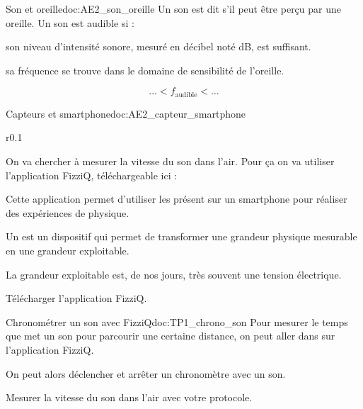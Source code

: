\begin{doc}{Son et oreille}{doc:AE2_son_oreille}
  Un son est dit  s'il peut être perçu par une oreille.
  Un son est audible si :
  \begin{listePoints}
    \item son niveau d'intensité sonore, mesuré en décibel noté dB, est suffisant.
    \item sa fréquence se trouve dans le domaine de sensibilité de l'oreille.
  \end{listePoints}
  \begin{equation*}
      \ldots < f_\text{audible} < \ldots
  \end{equation*}
\end{doc}



\begin{doc}{Capteurs et smartphone}{doc:AE2_capteur_smartphone}
  \begin{wrapfigure}[5]{r}{0.1\linewidth}
    \vspace*{-28pt}
    \medskip
    
  \end{wrapfigure}
  On va chercher à mesurer la vitesse du son dans l'air.
  Pour ça on va utiliser l'application FizziQ, téléchargeable ici :
  
  Cette application permet d'utiliser les  présent sur un smartphone pour réaliser des expériences de physique.
  
  \begin{importants}
    Un  est un dispositif qui permet de transformer une grandeur physique mesurable en une grandeur exploitable.
  \end{importants}
  La grandeur exploitable est, de nos jours, très souvent une tension électrique.
\end{doc}


\mesure
Télécharger l'application FizziQ.

\begin{doc}{Chronométrer un son avec FizziQ}{doc:TP1_chrono_son}
  Pour mesurer le temps que met un son pour parcourir une certaine distance, on peut aller dans  sur l'application FizziQ.

  On peut alors déclencher et arrêter un chronomètre avec un son.
\end{doc}


\mesure Mesurer la vitesse du son dans l'air avec votre protocole.